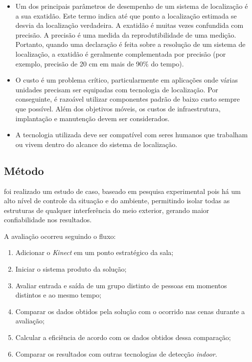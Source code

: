 \begin{itemize}
    \item Um dos principais parâmetros de desempenho de um sistema de localização é a sua exatidão. Este termo indica até que ponto a localização estimada se desvia da localização verdadeira. A exatidão é muitas vezes confundida com precisão. A precisão é uma medida da reprodutibilidade de uma medição. Portanto, quando uma declaração é feita sobre a resolução de um sistema de localização, a exatidão é geralmente complementada por precisão (por exemplo, precisão de 20 cm em mais de 90\% do tempo).
    \item O custo é um problema crítico, particularmente em aplicações onde várias unidades precisam ser equipadas com tecnologia de localização. Por conseguinte, é razoável utilizar componentes padrão de baixo custo sempre que possível. Além dos objetivos móveis, os custos de infraestrutura, implantação e manutenção devem ser considerados.
    \item A tecnologia utilizada deve ser compatível com seres humanos que trabalham ou vivem dentro do alcance do sistema de localização. 
\end{itemize} 

\subsection{Método}
foi realizado um estudo de caso, baseado em pesquisa experimental pois há um alto nível de controle da situação e do ambiente, permitindo isolar todas as estruturas de qualquer interferência do meio exterior, gerando maior confiabilidade nos resultados.

A avaliação ocorreu seguindo o fluxo:

\begin{enumerate}
\item Adicionar o \textit{Kinect} em um ponto estratégico da sala;
\item Iniciar o sistema produto da solução;
\item Avaliar entrada e saída de um grupo distinto de pessoas em momentos distintos e ao mesmo tempo;
\item Comparar os dados obtidos pela solução com o ocorrido nas cenas durante a avaliação;
\item Calcular a eficiência de acordo com os dados obtidos dessa comparação;
\item Comparar os resultados com outras tecnologias de detecção \textit{indoor}.
\end{enumerate}


